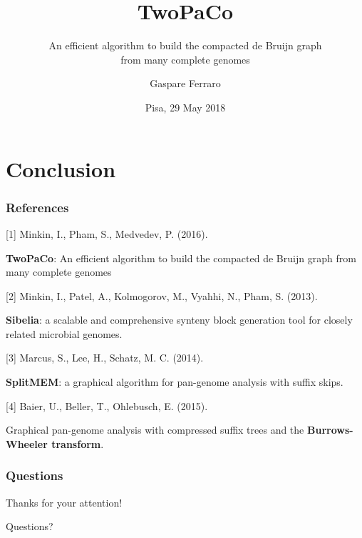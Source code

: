 \documentclass[11pt,svgnames,smaller]{beamer}
\author{Gaspare Ferraro}
\institute[University of Pisa]{University of Pisa\\Department of Computer Science}
\title{TwoPaCo}
\subtitle{An efficient algorithm to build the compacted de Bruijn graph\\from many complete genomes}
\date{Pisa, 29 May 2018}
\begin{document}
	

	\begin{frame} 
	\titlepage
	\end{frame}
			
	
	
	
	
	\section{Conclusion}
	
	\begin{frame}
  \frametitle{References}
  
  [1] Minkin, I., Pham, S., Medvedev, P. (2016). 
  
  \textbf{TwoPaCo}: An efficient algorithm to build the compacted de Bruijn graph from many complete genomes	  

  \medskip
  
  [2] Minkin, I., Patel, A., Kolmogorov, M., Vyahhi, N., Pham, S. (2013). 
  
  \textbf{Sibelia}: a scalable and comprehensive synteny block generation tool for closely related microbial
genomes.

  \medskip
  
  [3] Marcus, S., Lee, H., Schatz, M. C. (2014). 
  
  \textbf{SplitMEM}: a graphical algorithm for pan-genome analysis with suffix skips.

  \medskip

  [4] Baier, U., Beller, T., Ohlebusch, E. (2015). 
  
  Graphical pan-genome analysis with compressed suffix trees and the \textbf{Burrows-Wheeler transform}.

	\end{frame}

	\begin{frame}
		\frametitle{Questions}
		\centering
		\Large
		Thanks for your attention!
		
		\bigskip
		
		Questions?
 	\end{frame}
  
\end{document}
